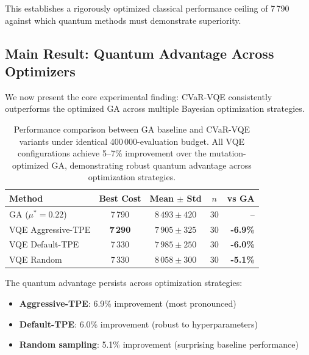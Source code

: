 This establishes a rigorously optimized classical performance ceiling of 7\,790 against which quantum methods must demonstrate superiority.

\subsection{Main Result: Quantum Advantage Across Optimizers}

We now present the core experimental finding: CVaR-VQE consistently outperforms the optimized GA across multiple Bayesian optimization strategies.


\begin{table}[htb]
    \centering
    \caption{Performance comparison between GA baseline and CVaR-VQE variants under identical 400\,000-evaluation budget. All VQE configurations achieve 5--7\% improvement over the mutation-optimized GA, demonstrating robust quantum advantage across optimization strategies.}
    \label{tab:main_results}
    \begin{tabular}{lcccr}
        \toprule
        Method & Best Cost & Mean $\pm$ Std & $n$ & vs GA \\
        \midrule
        GA ($\mu^* = 0.22$) & 7\,790 & $8\,493 \pm 420$ & 30 & -- \\
        VQE Aggressive-TPE & \textbf{7\,290} & $7\,905 \pm 325$ & 30 & \textbf{-6.9\%} \\
        VQE Default-TPE & 7\,330 & $7\,985 \pm 250$ & 30 & \textbf{-6.0\%} \\
        VQE Random & 7\,330 & $8\,058 \pm 300$ & 30 & \textbf{-5.1\%} \\
        \bottomrule
    \end{tabular}
\end{table}

The quantum advantage persists across optimization strategies:
\begin{itemize}[nosep]
    \item \textbf{Aggressive-TPE}: 6.9\% improvement (most pronounced)
    \item \textbf{Default-TPE}: 6.0\% improvement (robust to hyperparameters)  
    \item \textbf{Random sampling}: 5.1\% improvement (surprising baseline performance)
\end{itemize}

